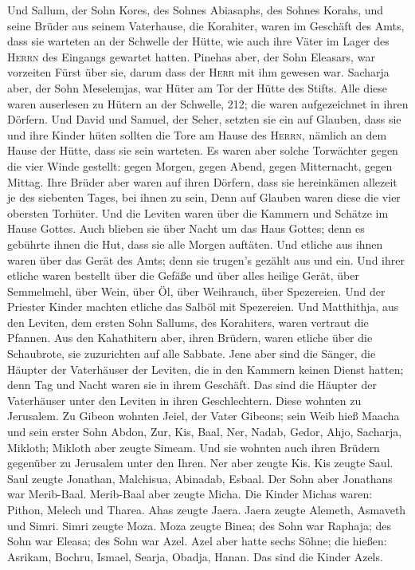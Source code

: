  Und Sallum, der Sohn Kores, des Sohnes Abiasaphs, des
Sohnes Korahs, und seine Brüder aus seinem Vaterhause, die Korahiter,
waren im Geschäft des Amts, dass sie warteten an der Schwelle der Hütte,
wie auch ihre Väter im Lager des \textsc{Herrn} des Eingangs gewartet
hatten.  Pinehas aber, der Sohn Eleasars, war vorzeiten
Fürst über sie, darum dass der \textsc{Herr} mit ihm gewesen war.
 Sacharja aber, der Sohn Meselemjas, war Hüter am Tor der
Hütte des Stifts.  Alle diese waren auserlesen zu Hütern
an der Schwelle, 212; die waren aufgezeichnet in ihren Dörfern. Und
David und Samuel, der Seher, setzten sie ein auf Glauben,
 dass sie und ihre Kinder hüten sollten die Tore am Hause
des \textsc{Herrn}, nämlich an dem Hause der Hütte, dass sie sein
warteten.  Es waren aber solche Torwächter gegen die vier
Winde gestellt: gegen Morgen, gegen Abend, gegen Mitternacht, gegen
Mittag.  Ihre Brüder aber waren auf ihren Dörfern, dass
sie hereinkämen allezeit je des siebenten Tages, bei ihnen zu sein,
 Denn auf Glauben waren diese die vier obersten Torhüter.
Und die Leviten waren über die Kammern und Schätze im Hause Gottes.
 Auch blieben sie über Nacht um das Haus Gottes; denn es
gebührte ihnen die Hut, dass sie alle Morgen auftäten. 
Und etliche aus ihnen waren über das Gerät des Amts; denn sie trugen's
gezählt aus und ein.  Und ihrer etliche waren bestellt
über die Gefäße und über alles heilige Gerät, über Semmelmehl, über
Wein, über Öl, über Weihrauch, über Spezereien.  Und der
Priester Kinder machten etliche das Salböl mit Spezereien.
 Und Matthithja, aus den Leviten, dem ersten Sohn
Sallums, des Korahiters, waren vertraut die Pfannen.  Aus
den Kahathitern aber, ihren Brüdern, waren etliche über die Schaubrote,
sie zuzurichten auf alle Sabbate.  Jene aber sind die
Sänger, die Häupter der Vaterhäuser der Leviten, die in den Kammern
keinen Dienst hatten; denn Tag und Nacht waren sie in ihrem Geschäft.
 Das sind die Häupter der Vaterhäuser unter den Leviten
in ihren Geschlechtern. Diese wohnten zu Jerusalem.  Zu
Gibeon wohnten Jeiel, der Vater Gibeons; sein Weib hieß Maacha
 und sein erster Sohn Abdon, Zur, Kis, Baal, Ner, Nadab,
 Gedor, Ahjo, Sacharja, Mikloth;  Mikloth
aber zeugte Simeam. Und sie wohnten auch ihren Brüdern gegenüber zu
Jerusalem unter den Ihren.  Ner aber zeugte Kis. Kis
zeugte Saul. Saul zeugte Jonathan, Malchisua, Abinadab, Esbaal.
 Der Sohn aber Jonathans war Merib-Baal. Merib-Baal aber
zeugte Micha.  Die Kinder Michas waren: Pithon, Melech
und Tharea.  Ahas zeugte Jaera. Jaera zeugte Alemeth,
Asmaveth und Simri. Simri zeugte Moza.  Moza zeugte
Binea; des Sohn war Raphaja; des Sohn war Eleasa; des Sohn war Azel.
 Azel aber hatte sechs Söhne; die hießen: Asrikam,
Bochru, Ismael, Searja, Obadja, Hanan. Das sind die Kinder Azels.

